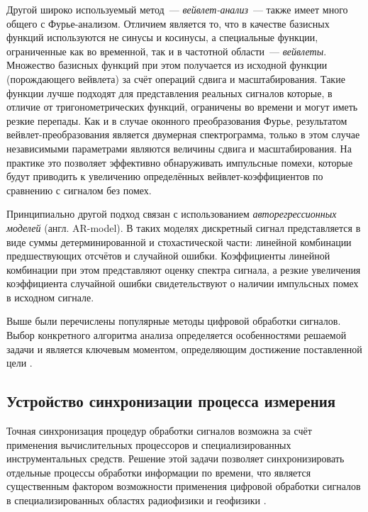 \documentclass[a4paper, 14pt, titlepage]{extarticle}
\newcommand{\eng}[1]{\foreignlanguage{english}{#1}}
\newcommand{\term}[1]{\emph{#1}}
\begin{document}
  Другой широко используемый метод~--- \term{вейвлет-анализ}~--- также имеет много общего с
  Фурье-анализом. Отличием является то, что в качестве базисных функций используются не синусы и
  косинусы, а специальные функции, ограниченные как во временной, так и в частотной области~---
  \term{вейвлеты}. Множество базисных функций при этом получается из исходной функции (порождающего
  вейвлета) за счёт операций сдвига и масштабирования. Такие функции лучше подходят для представления
  реальных сигналов которые, в отличие от тригонометрических функций, ограничены во времени и могут иметь
  резкие перепады. Как и в случае оконного преобразования Фурье, результатом вейвлет-преобразования является
  двумерная спектрограмма, только в этом случае независимыми параметрами являются величины сдвига и
  масштабирования. На практике это позволяет эффективно обнаруживать импульсные помехи, которые
  будут приводить к увеличению определённых вейвлет-коэффициентов по сравнению с сигналом без помех.

  Принципиально другой подход связан с использованием \term{авторегрессионных моделей} (англ.
  \eng{AR-model}). В таких моделях дискретный сигнал представляется в виде суммы детерминированной и
  стохастической части: линейной комбинации предшествующих отсчётов и случайной ошибки.
  Коэффициенты линейной комбинации при этом представляют оценку спектра сигнала, а резкие увеличения
  коэффициента случайной ошибки свидетельствуют о наличии импульсных помех в исходном сигнале.

  Выше были перечислены популярные методы цифровой обработки сигналов. Выбор конкретного алгоритма
  анализа определяется особенностями решаемой задачи и является ключевым моментом, определяющим
  достижение поставленной цели \cite{zubarev-realtime}.

  \subsection{Устройство синхронизации процесса измерения}\label{ssec:sync}

  Точная синхронизация процедур обработки
  сигналов возможна за счёт применения вычислительных процессоров и специализированных
  инструментальных средств. Решение этой задачи позволяет синхронизировать отдельные процессы
  обработки информации по времени, что является существенным фактором возможности применения
  цифровой обработки сигналов в специализированных областях радиофизики и геофизики \cite{rathore-digital}.
\end{document}
